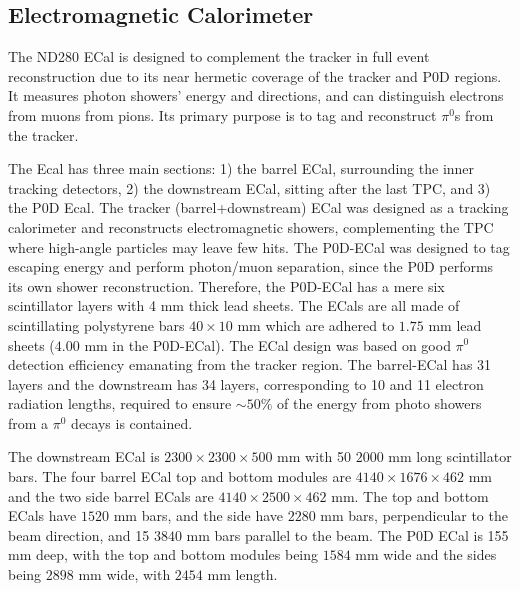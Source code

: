 \subsection{Electromagnetic Calorimeter}
The ND280 ECal\cite{t2k_ecal} is designed to complement the tracker in full event reconstruction due to its near hermetic coverage of the tracker and P0D regions. It measures photon showers' energy and directions, and can distinguish electrons from muons from pions. Its primary purpose is to tag and reconstruct $\pi^0$s from the tracker.

The Ecal has three main sections: 1) the barrel ECal, surrounding the inner tracking detectors, 2) the downstream ECal, sitting after the last TPC, and 3) the P0D Ecal. The tracker (barrel+downstream) ECal was designed as a tracking calorimeter and reconstructs electromagnetic showers, complementing the TPC where high-angle particles may leave few hits. The P0D-ECal was designed to tag escaping energy and perform photon/muon separation, since the P0D performs its own shower reconstruction. Therefore, the P0D-ECal has a mere six scintillator layers with 4 mm thick lead sheets. The ECals are all made of scintillating polystyrene bars $40\times10\text{ mm}$ which are adhered to $1.75\text{ mm}$ lead sheets ($4.00\text{ mm}$ in the P0D-ECal). The ECal design was based on good $\pi^0$ detection efficiency emanating from the tracker region. The barrel-ECal has 31 layers and the downstream has 34 layers, corresponding to 10 and 11 electron radiation lengths, required to ensure $\sim50\%$ of the energy from photo showers from a $\pi^0$ decays is contained.

The downstream ECal is $2300\times2300\times500\text{ mm}$ with 50 $2000\text{ mm}$ long scintillator bars. The four barrel ECal top and bottom modules are $4140\times1676\times462\text{ mm}$ and the two side barrel ECals are $4140\times2500\times462\text{ mm}$. The top and bottom ECals have $1520\text{ mm}$ bars, and the side have $2280\text{ mm}$ bars, perpendicular to the beam direction, and 15 $3840\text{ mm}$ bars parallel to the beam. The P0D ECal is 155 mm deep, with the top and bottom modules being $1584\text{ mm}$ wide and the sides being $2898\text{ mm}$ wide, with $2454\text{ mm}$ length.

